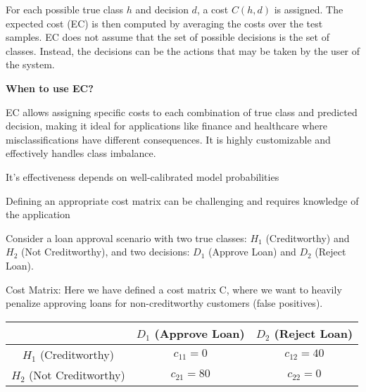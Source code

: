For each possible true class $h$ and decision $d$, a cost $C(h, d)$ is assigned. The expected cost (EC) is then computed by averaging the costs over the test samples. EC does not assume that the set of possible decisions is the set of classes. Instead, the decisions can be the actions that may be taken by the user of the system.


\textbf{When to use EC?}

EC allows assigning specific costs to each combination of true class and predicted decision, making it ideal for applications like finance and healthcare where misclassifications have different consequences. It is highly customizable and effectively handles class imbalance.

{
\item It's effectiveness depends on well-calibrated model probabilities 
\item Defining an appropriate cost matrix can be challenging and requires knowledge of the application 
}


\clearpage
\thispagestyle{classificationstyle}

Consider a loan approval scenario with two true classes: $H_1$ (Creditworthy) and $H_2$ (Not Creditworthy), and two decisions: $D_1$ (Approve Loan) and $D_2$ (Reject Loan).

Cost Matrix: Here we have defined a cost matrix C, where we want to heavily penalize approving loans for non-creditworthy customers (false positives).

\begin{center}
\begin{tabular}{|c|c|c|}
\hline
 & $D_1$ (Approve Loan) & $D_2$ (Reject Loan) \\
\hline
$H_1$ (Creditworthy) & $c_{11} =  0$ & $c_{12} = 40$ \\
\hline
$H_2$ (Not Creditworthy) & $c_{21} = 80$ & $c_{22} =  0$ \\
\hline
\end{tabular}
\end{center}

